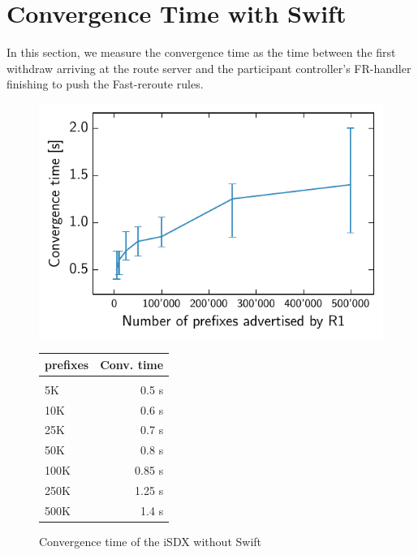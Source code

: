 \section{\label{chapter5:Convergence time with Swift}Convergence Time with Swift}

In this section, we measure the convergence time as the time between the first withdraw arriving at the route server and the participant controller's FR-handler finishing to push the Fast-reroute rules.

\begin{figure}[h]
\centering
\begin{minipage}[t]{.4\textwidth}
\centering
\vspace{0pt}
\includegraphics[scale = 1]{Figures/swift.pdf}
\end{minipage}\hfill
\begin{minipage}[t]{.4\textwidth}
\centering
\vspace{0pt}
\begin{tabular}{@{}lr@{}}
	\\
	prefixes & Conv. time \\
	\hline
	\\
    5K & 0.5 s  \\
    10K & 0.6 s   \\
    25K & 0.7 s   \\
    50K & 0.8 s  \\
    100K & 0.85 s \\
    250K & 1.25 s   \\
    500K & 1.4 s  \\
\end{tabular}
\end{minipage}
\caption{Convergence time of the iSDX without Swift}
\label{fig:withswift}
\end{figure}

